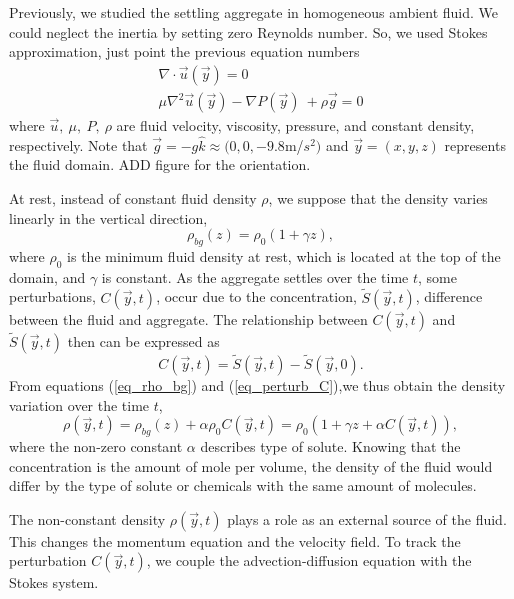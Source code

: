 Previously, we studied the settling aggregate in homogeneous ambient fluid. We could neglect the inertia by setting zero Reynolds number. So, we used Stokes approximation, 
{\color{blue} just point the previous equation numbers}
\begin{align}
	\nabla \cdot \vec{u} (\vec{y}) = 0 
	\\
	\mu \nabla^2 \vec{u} (\vec{y})   - \nabla P(\vec{y}) \ + \rho  \vec{g} = 0
\end{align}
where $\vec{u}, \ \mu, \ P, \ \rho$ are fluid velocity, viscosity, pressure, and constant density, respectively.
Note that $\vec{g} = - g\hat{k} \approx (0,0,-9.8$m/$s^2)$ and $\vec{y} = (x,y,z)$ represents the fluid domain. {\color{blue} ADD figure for the orientation.} 
\par
At rest, instead of constant fluid density $\rho$, we suppose that the density varies linearly in the vertical direction,
\begin{equation}
\rho_{bg}(z) =  \rho_0 \left(1 + \gamma z \right),
\label{eq_rho_bg}
\end{equation}
where $\rho_0$ is the minimum fluid density at rest, which is located at the top of the domain, and $\gamma$ is constant.
As the aggregate settles over the time $t$, some perturbations, $C(\vec{y},t)$, occur due to the concentration, $\tilde{S}(\vec{y},t)$, difference between the fluid and aggregate. 
The relationship between $C(\vec{y},t)$ and $\tilde{S}(\vec{y},t)$ then can be expressed as
\begin{equation}
C(\vec{y}, t) =  \tilde{S}(\vec{y},t) - \tilde{S}(\vec{y},0).
\label{eq_perturb_C}
\end{equation}
From equations (\ref{eq_rho_bg}) and (\ref{eq_perturb_C}),we thus obtain the density variation over the time $t$,
\begin{equation}
	\rho(\vec{y},t ) 
	= \rho_{bg}(z) +  \alpha \rho_0 C(\vec{y},t) 
	 = \rho_0 \left( 1 + \gamma z  + \alpha  C(\vec{y},t) \right),
\label{eq_density}
\end{equation}
where the non-zero constant $\alpha $ describes type of solute. Knowing that the concentration is the amount of mole per volume, the density of the fluid would differ by the type of solute or chemicals with the same amount of molecules.
\par
The non-constant density $\rho(\vec{y},t)$ plays a role as an external source of the fluid. This changes the momentum equation and the velocity field. To track the perturbation $C(\vec{y},t)$, we couple the advection-diffusion equation with the Stokes system. 
